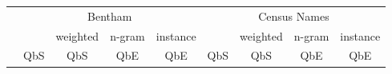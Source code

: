 \documentclass[ms,electronic,twosidetoc,letterpaper,chaptercenter,parttop,lol,lof,lot]{byumsphd}
\begin{document}
\begin{table}
\centering
\begin{tabular}{| l | c c c c | c c c c |}
  \hline
   & \multicolumn{4}{c|}{Bentham} & \multicolumn{4}{c|}{Census Names}\\
   &     & weighted & n-gram & instance &     & weighted & n-gram & instance \\
   & QbS & QbS      & QbE    & QbE      & QbS & QbS      & QbE    & QbE \\
  \hline %

\end{tabular}
\end{table}
\end{document}
